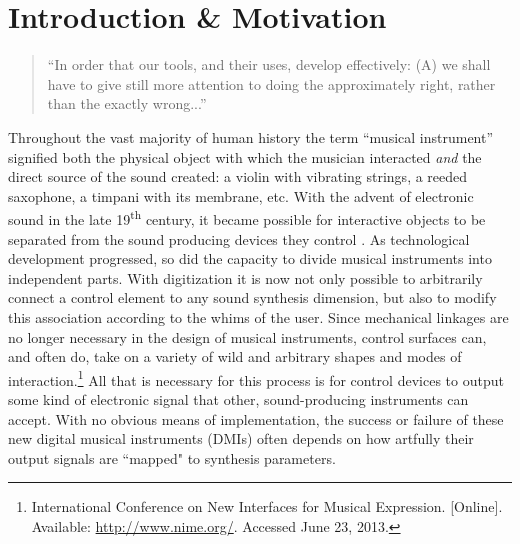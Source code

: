
\chapter{Introduction \& Motivation}

\begin{quote}
``In order that our tools, and their uses, develop effectively: (A) we shall have to give still more attention to doing the approximately right, rather than the exactly wrong...'' \cite{tuckey}
\end{quote}

Throughout the vast majority of human history the term ``musical instrument'' signified both the physical object with which the musician interacted \emph{and} the direct source of the sound created: a violin with vibrating strings, a reeded saxophone, a timpani with its membrane, etc.  With the advent of electronic sound in the late 19\textsuperscript{th} century, it became possible for interactive objects to be separated from the sound producing devices they control \cite{chadabe}.
As technological development progressed, so did the capacity to divide musical instruments into independent parts. With digitization it is now not only possible to arbitrarily connect a control element to any sound synthesis dimension, but also to modify this association according to the whims of the user. Since mechanical linkages are no longer necessary in the design of musical instruments, control surfaces can, and often do, take on a variety of wild and arbitrary shapes and modes of interaction.\footnote{International Conference on New Interfaces for Musical Expression. [Online]. Available: \url{http://www.nime.org/}. Accessed June 23, 2013.}
All that is necessary for this process is for control devices to output some kind of electronic signal that other, sound-producing instruments can accept. With no obvious means of implementation, the success or failure of these new digital musical instruments (DMIs) often depends on how artfully their output signals are ``mapped" to synthesis parameters.

